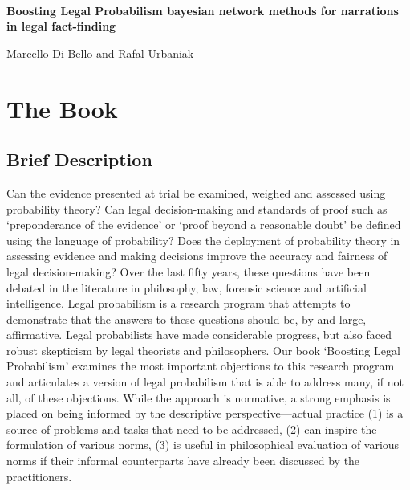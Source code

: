 \documentclass[
  10pt,
  dvipsnames,enabledeprecatedfontcommands]{scrartcl}
\author{}
\date{\vspace{-2.5em}}
\begin{document}
\begin{center}

$\, $

\vspace{-10mm}

\textbf{\huge  Boosting Legal Probabilism \linebreak \normalsize  bayesian network methods for narrations in legal fact-finding}
\vspace{2mm}

Marcello Di Bello and Rafal Urbaniak
\end{center}

\vspace{-4mm}

\hypertarget{the-book}{%
\section{The Book}\label{the-book}}

\vspace{-2mm}

\hypertarget{brief-description}{%
\subsection{Brief Description}\label{brief-description}}

\normalsize

Can the evidence presented at trial be examined, weighed and assessed
using probability theory? Can legal decision-making and standards of
proof such as `preponderance of the evidence' or `proof beyond a
reasonable doubt' be defined using the language of probability? Does the
deployment of probability theory in assessing evidence and making
decisions improve the accuracy and fairness of legal decision-making?
Over the last fifty years, these questions have been debated in the
literature in philosophy, law, forensic science and artificial
intelligence. Legal probabilism is a research program that attempts to
demonstrate that the answers to these questions should be, by and large,
affirmative. Legal probabilists have made considerable progress, but
also faced robust skepticism by legal theorists and philosophers. Our
book `Boosting Legal Probabilism' examines the most important objections
to this research program and articulates a version of legal probabilism
that is able to address many, if not all, of these
objections.
While the approach is normative, a strong emphasis is placed on being
informed by the descriptive perspective---actual practice (1) is a
source of problems and tasks that need to be addressed, (2) can inspire
the formulation of various norms, (3) is useful in philosophical
evaluation of various norms if their informal counterparts have already
been discussed by the practitioners.
\end{document}
